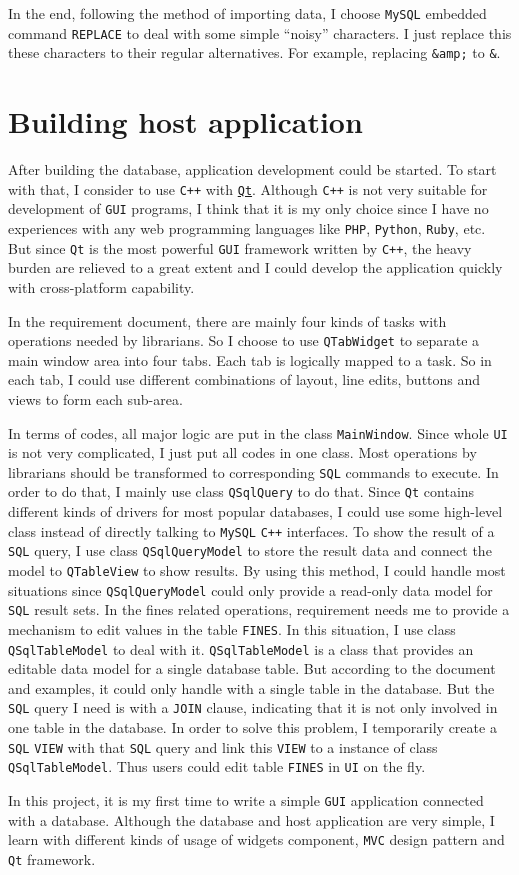 \documentclass[a4paper, 12pt]{report}
\begin{document}
In the end, following the method of importing data, I choose \lstinline{MySQL} embedded command \lstinline{REPLACE} to deal with some simple ``noisy'' characters. I just replace this these characters to their regular alternatives. For example, replacing \lstinline{&amp;} to \lstinline{&}.

\section*{Building host application}

After building the database, application development could be started. To start with that, I consider to use \lstinline{C++} with \href{https://www.qt.io/}{\lstinline{Qt}}. Although \lstinline{C++} is not very suitable for development of \lstinline{GUI} programs, I think that it is my only choice since I have no experiences with any web programming languages like \lstinline{PHP}, \lstinline{Python}, \lstinline{Ruby}, etc. But since \lstinline{Qt} is the most powerful \lstinline{GUI} framework written by \lstinline{C++}, the heavy burden are relieved to a great extent and I could develop the application quickly with cross-platform capability.

In the requirement document, there are mainly four kinds of tasks with operations needed by librarians. So I choose to use \lstinline{QTabWidget} to separate a main window area into four tabs. Each tab is logically mapped to a task. So in each tab, I could use different combinations of layout, line edits, buttons and views to form each sub-area. 

In terms of codes, all major logic are put in the class \lstinline{MainWindow}. Since whole \lstinline{UI} is not very complicated, I just put all codes in one class. Most operations by librarians should be transformed to corresponding \lstinline{SQL} commands to execute. In order to do that, I mainly use class \lstinline{QSqlQuery} to do that. Since \lstinline{Qt} contains different kinds of drivers for most popular databases, I could use some high-level class instead of directly talking to \lstinline{MySQL} \lstinline{C++} interfaces. To show the result of a \lstinline{SQL} query, I use class \lstinline{QSqlQueryModel} to store the result data and connect the model to \lstinline{QTableView} to show results. By using this method, I could handle most situations since \lstinline{QSqlQueryModel} could only provide a read-only data model for \lstinline{SQL} result sets. In the fines related operations, requirement needs me to provide a mechanism to edit values in the table \lstinline{FINES}. In this situation, I use class \lstinline{QSqlTableModel} to deal with it. \lstinline{QSqlTableModel} is a class that provides an editable data model for a single database table. But according to the document and examples, it could only handle with a single table in the database. But the \lstinline{SQL} query I need is with a \lstinline{JOIN} clause, indicating that it is not only involved in one table in the database. In order to solve this problem, I temporarily create a \lstinline{SQL} \lstinline{VIEW} with that \lstinline{SQL} query and link this \lstinline{VIEW} to a instance of class \lstinline{QSqlTableModel}. Thus users could edit table \lstinline{FINES} in \lstinline{UI} on the fly.

In this project, it is my first time to write a simple \lstinline{GUI} application connected with a database. Although the database and host application are very simple, I learn with different kinds of usage of widgets component, \lstinline{MVC} design pattern and \lstinline{Qt} framework.
\end{document}
